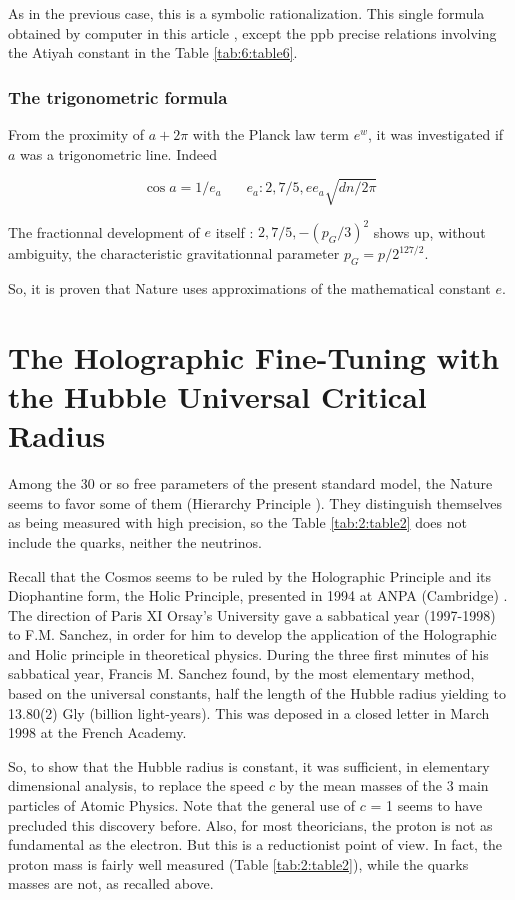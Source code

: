 \documentclass[a4paper,9pt]{article}
\begin{document}
As in the previous case, this is a symbolic rationalization. This single formula obtained by computer in this article \cite{LaGuer}, except the ppb precise relations involving the Atiyah constant in the Table \ref{tab:6:table6}.

\subsubsection {The trigonometric formula}
From the proximity of $a + 2\pi$ with the Planck law term $e^w$, it was investigated if $a$ was a trigonometric line. Indeed 
 
\begin{equation}
\cos{a} = 1/e_a ~~~~~~~~  e_a : 2, 7/5, ee_a \sqrt{dn/2\pi} 
\end{equation}

The fractionnal development of $e$ itself : $2,7/5, -(p_G/3)^2$ shows up, without ambiguity, the characteristic gravitationnal parameter $p_G = p/2^{127/2}$.

So, it is proven that Nature uses approximations of the mathematical constant $e$.


\section{The Holographic Fine-Tuning with the Hubble Universal Critical Radius}

Among the 30 or so free parameters of the present standard model, the Nature seems to favor some of them (Hierarchy Principle \cite{Sanchez}). They distinguish themselves as being measured with high precision, so the Table \ref{tab:2:table2} does not include the quarks, neither the neutrinos. 

Recall that the Cosmos seems to be ruled by the Holographic Principle and its Diophantine form, the Holic Principle, presented in 1994 at ANPA (Cambridge)  \cite{Sanchez1}. The direction of Paris XI Orsay's University gave a sabbatical year (1997-1998) to F.M. Sanchez, in order for him to develop the application of the Holographic and Holic principle in theoretical physics. During the three first minutes of his sabbatical year, Francis M. Sanchez found, by the most elementary method, based on the universal constants, half the length of the Hubble radius yielding to 13.80(2) Gly (billion light-years). This was deposed in a closed letter in March 1998 at the French Academy. 


So, to show that the Hubble radius is constant, it was sufficient, in elementary dimensional analysis, to replace the speed $c$ by the mean masses of the 3 main particles of Atomic Physics\cite{Maruani}. Note that the general use of $c$ = 1 seems to have precluded this discovery before. Also, for most theoricians, the proton is not as fundamental as the electron. But this is a reductionist point of view. In fact, the proton mass is fairly well measured (Table \ref{tab:2:table2}), while the quarks masses are not, as recalled above.
 
\end{document}
